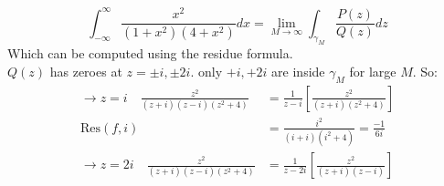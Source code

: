 \begin{example}
    \begin{equation*}
        \int_{-\infty}^{\infty} \frac{x^2}{(1 + x^2)(4 + x^2)} dx = \lim_{M \to \infty} \int_{\gamma_M} \frac{P(z)}{Q(z)} dz
    \end{equation*}
    Which can be computed using the residue formula. \\
    $Q(z)$ has zeroes at $z = \pm i, \pm 2i$. only $+i, +2i$ are inside $\gamma_M$ for large $M$. So:
    \begin{align*}
        \rightarrow \boxed{z = i} \quad \frac{z^2}{(z + i)(z-i)(z^2 + 4)}  & = \frac{1}{z - i}\left[\frac{z^2}{(z + i)(z^2 + 4)}\right] \\
        \text{Res}(f, i)                                                   & = \frac{i^2}{(i + i)(i^2 + 4)} = \frac{-1}{6i}             \\
        \rightarrow \boxed{z = 2i} \quad \frac{z^2}{(z + i)(z-i)(z^2 + 4)} & = \frac{1}{z - 2i}\left[\frac{z^2}{(z + i)(z - i)}\right]
    \end{align*}
\end{example}
